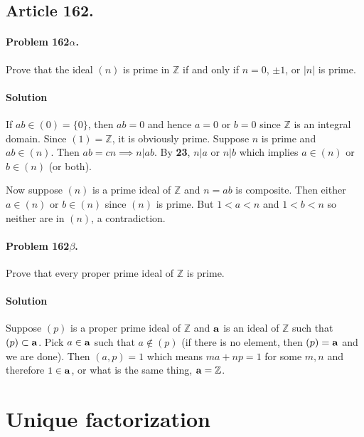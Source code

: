 \subsection{Article 162.}

\paragraph{Problem 162$\alpha$.}
Prove that the ideal $(n)$ is prime in $\mathbb{Z}$ if and only if $ n =
0$, $\pm 1$, or $|n|$ is prime.

\paragraph*{Solution}
If $ab \in (0) = \{0\}$, then $ab = 0$ and hence $a=0$ or $b=0$ since
$\mathbb{Z}$ is an integral domain. Since $(1) = \mathbb{Z}$, it is
obviously prime. Suppose $n$ is prime and $ab \in (n)$. Then $ab = cn
\implies n | ab$. By \textbf{23}, $n | a$ or $n | b$ which implies $a
\in (n)$ or $b \in (n)$ (or both).

Now suppose $(n)$ is a prime ideal of $\mathbb{Z}$ and $n = ab$ is
composite. Then either $a \in (n)$ or $b \in (n)$ since $(n)$ is
prime. But $1 < a < n$ and $1 < b < n$ so neither are in $(n)$, a
contradiction.

\paragraph{Problem 162$\beta$.}
Prove that every proper prime ideal of $\mathbb{Z}$ is prime.

\paragraph*{Solution}
Suppose $(p)$ is a proper prime ideal of $\mathbb{Z}$ and $\mathsf{\mathbf{a}}$
is an ideal of $\mathbb{Z}$ such that $(p) \subset \mathsf{\mathbf{a}}$. Pick $a
\in \mathsf{\mathbf{a}}$ such that $a \notin (p)$ (if there is no element, then
$(p) = \mathsf{\mathbf{a}}$ and we are done). Then $(a,p) = 1$ which means $ma +
np = 1$ for some $m, n$ and therefore $1 \in \mathsf{\mathbf{a}}$, or what is
the same thing, $\mathsf{\mathbf{a}} = \mathbb{Z}$.

\section{Unique factorization}

